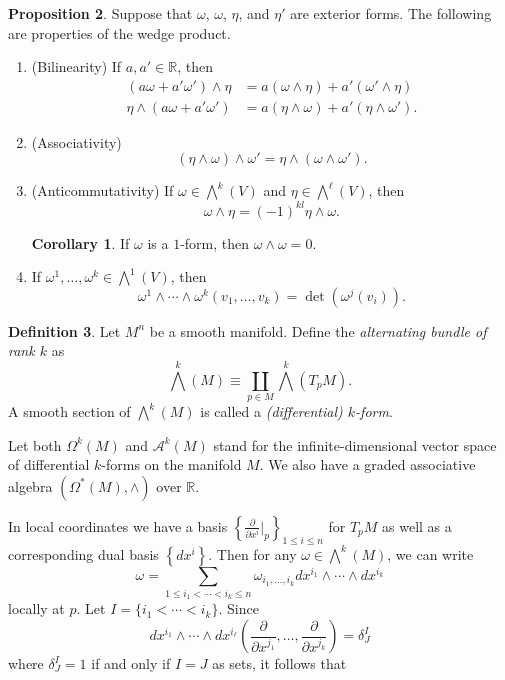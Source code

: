 \documentclass[10pt,letterpaper,cm]{nupset}
\theoremstyle{definition}
\newtheorem{definition}{Definition}[subsection]
\theoremstyle{theorem}
\newtheorem{prop}[definition]{Proposition}
\newtheorem{corollary}[definition]{Corollary}
\theoremstyle{remark}
\newcommand{\R}{\mathbb R}
\newcommand{\1}{\mathbf{1}}
\newcommand{\0}{\vec 0}
\begin{document}
\begin{prop}\label{stuff} Suppose that $\omega$, $\omega$, $\eta$, and $\eta'$ are exterior forms. The following are properties of the wedge product.
\begin{enumerate}[label=(\arabic*)]
\item{(Bilinearity)} If $a, a' \in \R$, then 
\begin{align*}
(a\omega + a'\omega ')\wedge \eta &= a(\omega \wedge \eta) + a'(\omega' \wedge \eta)   \\   \eta \wedge (a\omega + a'\omega ') &= a(\eta \wedge \omega) + a'(\eta \wedge \omega' ). 
\end{align*}
\item{(Associativity)} $$\left(\eta \wedge \omega\right) \wedge \omega' =    \eta \wedge \left(\omega \wedge \omega'\right) .$$
\item{(Anticommutativity)} If $\omega \in \bigwedge^k(V)$ and $\eta \in \bigwedge^{\ell}(V)$, then $$\omega \wedge \eta = \left({-1}\right)^{kl}\eta \wedge \omega.   $$
\begin{corollary}
If $\omega$ is a $1$-form, then $\omega \wedge \omega = 0$.
\end{corollary}
\item If $\omega^1, \ldots, \omega^k \in \bigwedge^1(V)$, then $$ \omega^1 \wedge \cdots \wedge \omega^k(v_1, \ldots, v_k) =\det(\omega^j(v_i)). $$ 
\end{enumerate}
\end{prop}

\begin{definition}
Let $M^n$ be a smooth manifold. Define the \textit{alternating bundle of rank $k$} as $$\bigwedge^k(M) \equiv \coprod_{p\in M} \bigwedge^k(T_pM).  $$ 
A smooth section of $\bigwedge^k(M)$ is called a \textit{(differential) $k$-form}.
\end{definition}

Let both $\Omega^k(M)$ and $\mathcal{A}^k(M)$ stand for the infinite-dimensional vector space of differential $k$-forms on the manifold $M$. We also have a graded associative algebra $\left(\Omega^{\ast}(M), \wedge \right)$ over $\R$.  


\medskip

In local coordinates we have a basis $\left\{\frac{\partial}{\partial{x^i}}\bigr\rvert_p\right\}_{1\leq i \leq n}$ for $T_pM$ as well as a corresponding dual basis $\left\{dx^i\right\}$. Then for any $\omega \in \bigwedge^k(M)$, we can write 
\[ \label{eqn:ahh}
 \omega = \sum_{1\leq i_1 < \cdots < i_k \leq n}\omega_{i_1, \ldots, i_k} dx^{i_1} \wedge \cdots \wedge dx^{i_k} 
 \tag{1}
 \] locally at $p$. Let $I =  \{i_1 < \cdots < i_k\}$. Since $$dx^{i_1} \wedge \cdots \wedge dx^{i_{\ell}}\left( \frac{\partial}{\partial{x^{j_1}}}, \ldots, \frac{\partial}{\partial{x^{j_k}}} \right) = \delta^I_J$$ where $\delta^I_J = 1$ if and only if $I = J$ as sets, it follows that
\end{document}
